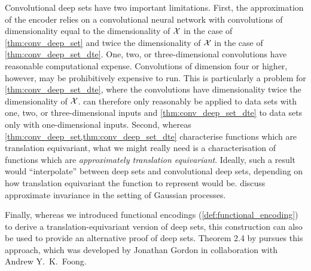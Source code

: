 \documentclass[12pt, twoside]{report}
\begin{document}
Convolutional deep sets have two important limitations.
First, the approximation of the encoder relies on a convolutional neural network with convolutions of dimensionality equal to the dimensionality of $\mathcal{X}$ in the case of \cref{thm:conv_deep_set} and twice the dimensionality of $\mathcal{X}$ in the case of \cref{thm:conv_deep_set_dte}.
One, two, or three-dimensional convolutions have reasonable computational expense.
Convolutions of dimension four or higher, however, may be prohibitively expensive to run.
This is particularly a problem for \cref{thm:conv_deep_set_dte}, where the convolutions have dimensionality twice the dimensionality of $\mathcal{X}$.
 can therefore only reasonably be applied to data sets with one, two, or three-dimensional inputs
and \cref{thm:conv_deep_set_dte} to data sets only with one-dimensional inputs.
Second, whereas \cref{thm:conv_deep_set,thm:conv_deep_set_dte} characterise functions which are translation equivariant, what we might really need is a characterisation of functions which are \emph{approximately translation equivariant}.
Ideally, such a result would ``interpolate'' between deep sets and convolutional deep sets, depending on how translation equivariant the function to represent would be.
\Textcite{Wilk:2018:Learning_Invariances_Using_the_Marginal} discuss approximate invariance in the setting of Gaussian processes.

Finally, whereas we introduced functional encodings (\cref{def:functional_encoding}) to derive a translation-equivariant version of deep sets, this construction can also be used to provide an alternative proof of deep sets.
Theorem 2.4 by \textcite{Gordon:2020:Advanced_in_Probabilistic_Meta-Learning} pursues this approach, which was developed by Jonathan Gordon in collaboration with Andrew Y.\ K.\ Foong.
\end{document}
